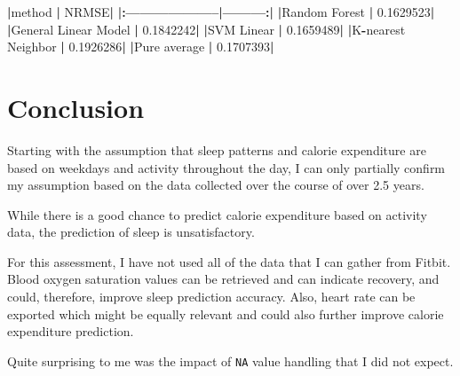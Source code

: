 \documentclass[
]{article}
\newenvironment{Shaded}{\begin{snugshade}}{\end{snugshade}}
\newcommand{\ErrorTok}[1]{\textcolor[rgb]{0.64,0.00,0.00}{\textbf{#1}}}
\newcommand{\FloatTok}[1]{\textcolor[rgb]{0.00,0.00,0.81}{#1}}
\newcommand{\NormalTok}[1]{#1}
\newcommand{\OperatorTok}[1]{\textcolor[rgb]{0.81,0.36,0.00}{\textbf{#1}}}
\newcommand{\StringTok}[1]{\textcolor[rgb]{0.31,0.60,0.02}{#1}}
\begin{document}
\begin{Shaded}
\begin{Highlighting}[]
\OperatorTok{|}\NormalTok{method               }\OperatorTok{|}\StringTok{     }\NormalTok{NRMSE}\OperatorTok{|}
\ErrorTok{|:}\OperatorTok{--------------------}\ErrorTok{|}\OperatorTok{---------}\ErrorTok{:|}
\ErrorTok{|}\NormalTok{Random Forest        }\OperatorTok{|}\StringTok{ }\FloatTok{0.1629523}\OperatorTok{|}
\ErrorTok{|}\NormalTok{General Linear Model }\OperatorTok{|}\StringTok{ }\FloatTok{0.1842242}\OperatorTok{|}
\ErrorTok{|}\NormalTok{SVM Linear           }\OperatorTok{|}\StringTok{ }\FloatTok{0.1659489}\OperatorTok{|}
\ErrorTok{|}\NormalTok{K}\OperatorTok{-}\NormalTok{nearest Neighbor   }\OperatorTok{|}\StringTok{ }\FloatTok{0.1926286}\OperatorTok{|}
\ErrorTok{|}\NormalTok{Pure average         }\OperatorTok{|}\StringTok{ }\FloatTok{0.1707393}\OperatorTok{|}
\end{Highlighting}
\end{Shaded}

\newpage

\hypertarget{conclusion}{%
\section{Conclusion}\label{conclusion}}

Starting with the assumption that sleep patterns and calorie expenditure
are based on weekdays and activity throughout the day, I can only
partially confirm my assumption based on the data collected over the
course of over 2.5 years.

While there is a good chance to predict calorie expenditure based on
activity data, the prediction of sleep is unsatisfactory.

For this assessment, I have not used all of the data that I can gather
from Fitbit. Blood oxygen saturation values can be retrieved and can
indicate recovery, and could, therefore, improve sleep prediction
accuracy. Also, heart rate can be exported which might be equally
relevant and could also further improve calorie expenditure prediction.

Quite surprising to me was the impact of \texttt{NA} value handling that
I did not expect.
\end{document}
